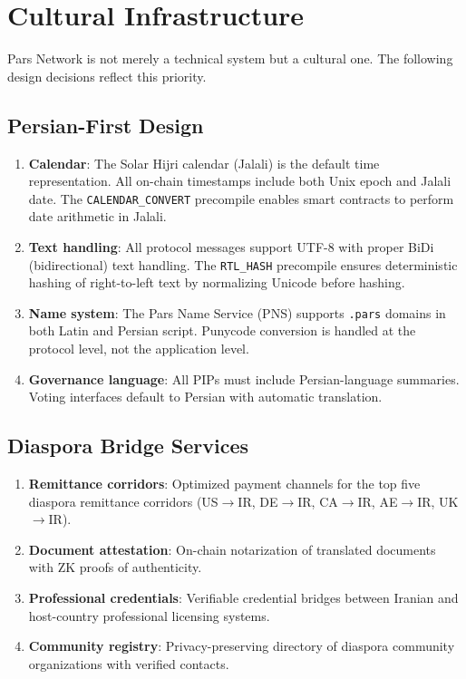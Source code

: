 \documentclass[11pt,a4paper]{article}
\begin{document}
\section{Cultural Infrastructure}
\label{sec:cultural}

Pars Network is not merely a technical system but a cultural one. The following design decisions reflect this priority.

\subsection{Persian-First Design}

\begin{enumerate}
    \item \textbf{Calendar}: The Solar Hijri calendar (Jalali) is the default time representation. All on-chain timestamps include both Unix epoch and Jalali date. The \texttt{CALENDAR\_CONVERT} precompile enables smart contracts to perform date arithmetic in Jalali.

    \item \textbf{Text handling}: All protocol messages support UTF-8 with proper BiDi (bidirectional) text handling. The \texttt{RTL\_HASH} precompile ensures deterministic hashing of right-to-left text by normalizing Unicode before hashing.

    \item \textbf{Name system}: The Pars Name Service (PNS) supports \texttt{.pars} domains in both Latin and Persian script. Punycode conversion is handled at the protocol level, not the application level.

    \item \textbf{Governance language}: All PIPs must include Persian-language summaries. Voting interfaces default to Persian with automatic translation.
\end{enumerate}

\subsection{Diaspora Bridge Services}

\begin{enumerate}
    \item \textbf{Remittance corridors}: Optimized payment channels for the top five diaspora remittance corridors (US$\rightarrow$IR, DE$\rightarrow$IR, CA$\rightarrow$IR, AE$\rightarrow$IR, UK$\rightarrow$IR).
    \item \textbf{Document attestation}: On-chain notarization of translated documents with ZK proofs of authenticity.
    \item \textbf{Professional credentials}: Verifiable credential bridges between Iranian and host-country professional licensing systems.
    \item \textbf{Community registry}: Privacy-preserving directory of diaspora community organizations with verified contacts.
\end{enumerate}
\end{document}
